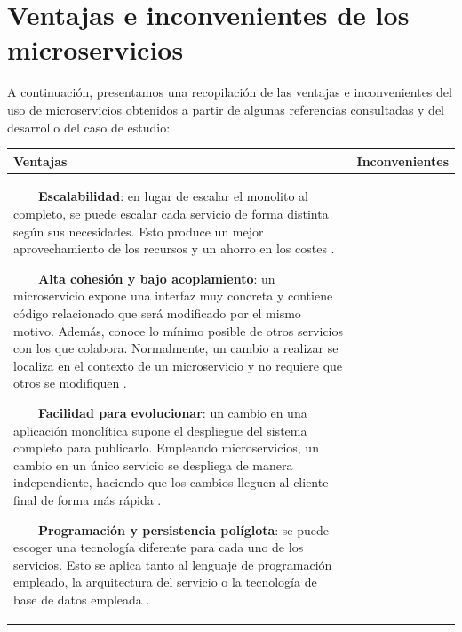 \documentclass[11pt,spanish,listoffigures]{tfgetsinf}
\newcommand{\tabitem}{~~\llap{\textbullet}~~}
\begin{document}
\newpage

\section{Ventajas e inconvenientes de los microservicios}

A continuación, presentamos una recopilación de las ventajas e inconvenientes del uso de microservicios obtenidos a partir de algunas referencias consultadas y del desarrollo del caso de estudio:

\begin{center}
\begin{tabular}{|p{7.1cm}|p{7.1cm}|}
\hline

\textbf{ Ventajas } & \textbf{ Inconvenientes } \\
\hline

\vspace{0.25mm}
\tabitem \textbf{Escalabilidad}: en lugar de escalar el monolito al completo, se puede escalar cada servicio de forma distinta según sus necesidades. Esto produce un mejor aprovechamiento de los recursos y un ahorro en los costes \cite{Newman2015a, DelaTorre2018, Lewis2014}.

\vspace{2mm}
\tabitem \textbf{Alta cohesión y bajo acoplamiento}: un microservicio expone una interfaz muy concreta y contiene código relacionado que será modificado por el mismo motivo. Además, conoce lo mínimo posible de otros servicios con los que colabora. Normalmente, un cambio a realizar se localiza en el contexto de un microservicio y no requiere que otros se modifiquen \cite{Newman2015a, DelaTorre2018, Hunter2017}.

\vspace{2mm}
\tabitem \textbf{Facilidad para evolucionar}: un cambio en una aplicación monolítica supone el despliegue del sistema completo para publicarlo. Empleando microservicios, un cambio en un único servicio se despliega de manera independiente, haciendo que los cambios lleguen al cliente final de forma más rápida \cite{Newman2015a, DelaTorre2018, Lewis2014, Hunter2017}.

\vspace{2mm}
\tabitem \textbf{Programación y persistencia políglota}: se puede escoger una tecnología diferente para cada uno de los servicios. Esto se aplica tanto al lenguaje de programación empleado, la arquitectura del servicio o la tecnología de base de datos empleada \cite{Newman2015a, DelaTorre2018, Lewis2014, Hunter2017}.


\end{tabular}
\end{center}
\end{document}
